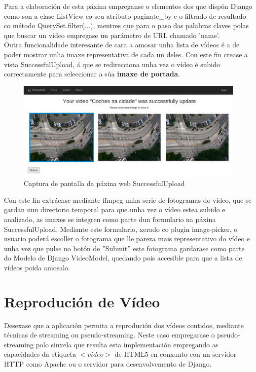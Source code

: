     Para a elaboración de esta páxina empreganse o elementos dos que dispón Django como son a
    clase ListView co seu atributo paginate\_by e o filtrado de resultado co método 
    QuerySet.filter(...), mentres que para o paso das palabras claves polas que buscar un vídeo
    empregase un parámetro de URL chamado 'name'.\\
    
    Outra funcionalidade interesante de cara a amosar unha lista de vídeos é a de poder mostrar unha
    imaxe representativa de cada un deles. Con este fin crease a vista SuccessfulUpload, á que se
    redirecciona unha vez o vídeo é subido correctamente para seleccionar a súa \textbf{imaxe de portada}.
    
    \begin{figure}[htp]
    \begin{center}
        \includegraphics[scale=0.35]{figures/SuccessfulUploadScreen.png}
        \caption{Captura de pantalla da páxina web SuccessfulUpload}
    \label{fig:SuccessfulUploadScreen}
    \end{center}
    \end{figure}
    
    Con este fin extráense mediante ffmpeg unha serie de fotogramas do vídeo, que se gardan nun
    directorio temporal para que unha vez o vídeo estea subido e analizado, as imaxes se integren 
    como parte dun formulario na páxina SuccessfulUpload. Mediante este formulario, xerado co plugin
    image-picker\cite{ImagePickerPage}, o usuario poderá escoller o fotograma que lle pareza mais
    representativo do vídeo e unha vez que pulse no botón de ''Submit'' este fotograma gardarase
    como parte do Modelo de Django VideoModel, quedando pois accesible para que a lista de vídeos 
    poida amosalo.
    
	
\section{Reprodución de Vídeo}
    Desexase que a aplicación permita a reprodución dos vídeos contidos, mediante técnicas de
    streaming ou pseudo-streaming. Neste caso empregarase o pseudo-streaming polo sinxela que
    resulta esta implementación empregando as capacidades da etiqueta $<video>$ de HTML5 en conxunto
    con un servidor HTTP como Apache ou o servidor para desenvolvemento de Django.

